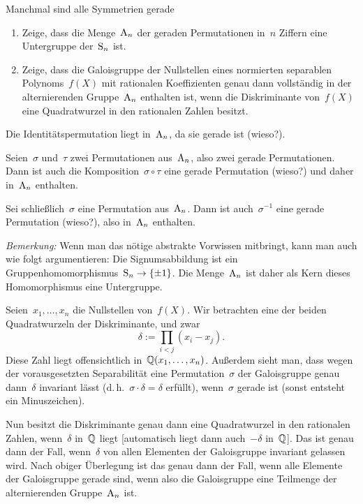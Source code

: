 \documentclass{algblatt}
\begin{document}
\begin{aufgabe}{Manchmal sind alle Symmetrien gerade}
\begin{enumerate}
\item Zeige, dass die Menge~$\mathrm{A}_n$ der geraden Permutationen in~$n$ Ziffern eine
Untergruppe der~$\mathrm{S}_n$ ist.

\item Zeige, dass die Galoisgruppe der Nullstellen eines normierten separablen
Polynoms~$f(X)$ mit rationalen Koeffizienten genau dann vollständig in der
alternierenden Gruppe~$\mathrm{A}_n$ enthalten ist, wenn die Diskriminante von~$f(X)$
eine Quadratwurzel in den rationalen Zahlen besitzt.
\end{enumerate}

\begin{loesungE}
\item Die Identitätspermutation liegt in~$\mathrm{A}_n$, da sie gerade ist (wieso?).

Seien~$\sigma$ und~$\tau$ zwei Permutationen aus~$\mathrm{A}_n$, also zwei gerade
Permutationen. Dann ist auch die Komposition~$\sigma \circ \tau$ eine gerade
Permutation (wieso?) und daher in~$\mathrm{A}_n$ enthalten.

Sei schließlich~$\sigma$ eine Permutation aus~$\mathrm{A}_n$. Dann ist
auch~$\sigma^{-1}$ eine gerade Permutation (wieso?), also in~$\mathrm{A}_n$ enthalten.

\emph{Bemerkung:} Wenn man das nötige abstrakte Vorwissen mitbringt, kann man
auch wie folgt argumentieren: Die Signumsabbildung ist ein
Gruppenhomomorphismus~$\mathrm{S}_n \to \{ \pm1 \}$. Die Menge~$\mathrm{A}_n$ ist daher als Kern
dieses Homomorphismus eine Untergruppe.

\item Seien~$x_1, \ldots, x_n$ die Nullstellen von~$f(X)$. Wir betrachten eine
der beiden Quadratwurzeln der Diskriminante, und zwar
\[ \delta := \prod_{i < j} (x_i - x_j). \]
Diese Zahl liegt offensichtlich in~$\mathbb{Q}(x_1,\ldots,x_n)$. Außerdem sieht man,
dass wegen der vorausgesetzten Separabilität eine Permutation~$\sigma$ der
Galoisgruppe genau dann~$\delta$ invariant lässt (d.\,h.~$\sigma \cdot \delta =
\delta$ erfüllt), wenn~$\sigma$ gerade ist (sonst entsteht ein Minuszeichen).

Nun besitzt die Diskriminante genau dann eine Quadratwurzel in den rationalen
Zahlen, wenn~$\delta$ in~$\mathbb{Q}$ liegt [automatisch liegt dann auch~$-\delta$
in~$\mathbb{Q}$]. Das ist genau dann der Fall, wenn~$\delta$ von allen Elementen der
Galoisgruppe invariant gelassen wird. Nach obiger Überlegung ist das genau dann
der Fall, wenn alle Elemente der Galoisgruppe gerade sind, wenn also die
Galoisgruppe eine Teilmenge der alternierenden Gruppe~$\mathrm{A}_n$ ist.
\end{loesungE}
\end{aufgabe}
\end{document}
